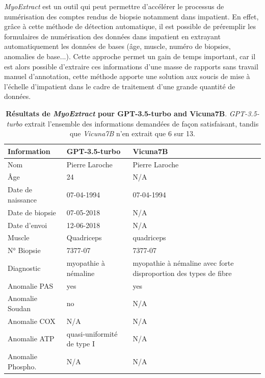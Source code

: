 \textit{MyoExtract} est un outil qui peut permettre d'accélérer le processus de numérisation des comptes rendus de biopsie notamment dans \gls{impatient}. En effet, grâce à cette méthode de détection automatique, il est possible de préremplir les formulaires de numérisation des données dans \gls{impatient} en extrayant automatiquement les données de bases (âge, muscle, numéro de biopsies, anomalies de base...). Cette approche permet un gain de temps important, car il est alors possible d'extraire ces informations d'une masse de rapports sans travail manuel d'annotation, cette méthode apporte une solution aux soucis de mise à l'échelle d'\gls{impatient} dans le cadre de traitement d'une grande quantité de données.
\begin{table}[!ht]
\centering
\caption[Résultats de \textit{MyoExtract} pour \textit{GPT-3.5-turbo} and \textit{Vicuna7B}]{\textbf{Résultats de \textit{MyoExtract} pour GPT-3.5-turbo and Vicuna7B}. \textit{GPT-3.5-turbo} extrait l'ensemble des informations demandées de façon satisfaisant, tandis que \textit{Vicuna7B} n'en extrait que 6 sur 13.}
\label{tab:json_data}
\begin{tabularx}{\textwidth}{|l|X|X|}
\hline
\textbf{Information} & \textbf{GPT-3.5-turbo} & \textbf{Vicuna7B} \\ \hline
Nom & Pierre Laroche & Pierre Laroche \\ \hline
Âge & 24 & N/A \\ \hline
Date de naissance & 07-04-1994 & 07-04-1994 \\ \hline
Date de biopsie & 07-05-2018 & N/A \\ \hline
Date d'envoi & 12-06-2018 & N/A \\ \hline
Muscle & Quadriceps & quadriceps \\ \hline
N° Biopsie & 7377-07 & 7377-07 \\ \hline
Diagnostic & myopathie à némaline & myopathie à némaline avec forte disproportion des types de fibre \\ \hline
Anomalie PAS & yes & yes \\ \hline
Anomalie Soudan & no & N/A \\ \hline
Anomalie COX & N/A & N/A \\ \hline
Anomalie ATP & quasi-uniformité de type I & N/A \\ \hline
Anomalie Phospho. & N/A & N/A \\ \hline
\end{tabularx}
\end{table}

